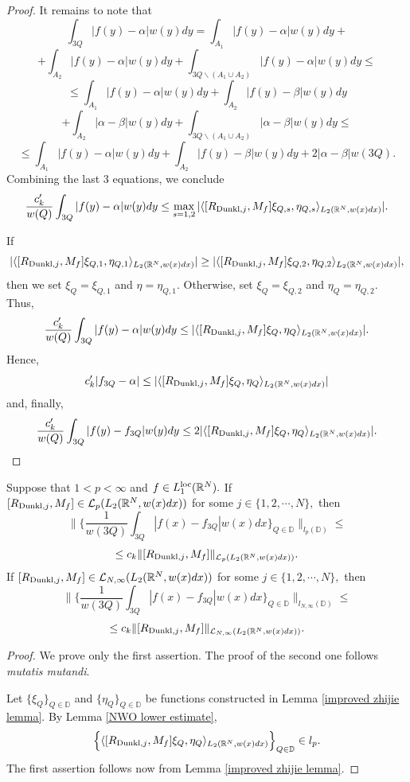 \documentclass{amsart}
\begin{document}
\begin{proof}
It remains to note that
$$\int_{3Q}|f(y)-\alpha|w(y)dy=\int_{A_1}|f(y)-\alpha|w(y)dy+$$
$$+\int_{A_2}|f(y)-\alpha|w(y)dy+\int_{3Q\backslash(A_1\cup A_2)}|f(y)-\alpha|w(y)dy\leq$$
$$\leq\int_{A_1}|f(y)-\alpha|w(y)dy+\int_{A_2}|f(y)-\beta|w(y)dy$$
$$+\int_{A_2}|\alpha-\beta|w(y)dy+\int_{3Q\backslash(A_1\cup A_2)}|\alpha-\beta|w(y)dy\leq$$
$$\leq\int_{A_1}|f(y)-\alpha|w(y)dy+\int_{A_2}|f(y)-\beta|w(y)dy+2|\alpha-\beta|w(3Q).$$
Combining the last $3$ equations, we conclude
$$\frac{c_k'}{w(Q)}\int_{3Q}|f(y)-\alpha|w(y)dy\leq\max_{s=1,2}|\langle[R_{{\rm Dunkl},j},M_f]\xi_{Q,s},\eta_{Q,s}\rangle_{L_2(\mathbb{R}^N,w(x)dx)}|.$$

If
$$|\langle[R_{{\rm Dunkl},j},M_f]\xi_{Q,1},\eta_{Q,1}\rangle_{L_2(\mathbb{R}^N,w(x)dx)}|\geq |\langle[R_{{\rm Dunkl},j},M_f]\xi_{Q,2},\eta_{Q,2}\rangle_{L_2(\mathbb{R}^N,w(x)dx)}|,$$
then we set $\xi_Q=\xi_{Q,1}$ and $\eta=\eta_{Q,1}.$ Otherwise, set $\xi_Q=\xi_{Q,2}$ and $\eta_Q=\eta_{Q,2}.$ Thus,
$$\frac{c_k'}{w(Q)}\int_{3Q}|f(y)-\alpha|w(y)dy\leq|\langle[R_{{\rm Dunkl},j},M_f]\xi_Q,\eta_Q\rangle_{L_2(\mathbb{R}^N,w(x)dx)}|.$$
Hence,
$$c_k'|f_{3Q}-\alpha|\leq|\langle[R_{{\rm Dunkl},j},M_f]\xi_Q,\eta_Q\rangle_{L_2(\mathbb{R}^N,w(x)dx)}|$$
and, finally,
$$\frac{c_k'}{w(Q)}\int_{3Q}|f(y)-f_{3Q}|w(y)dy\leq 2|\langle[R_{{\rm Dunkl},j},M_f]\xi_Q,\eta_Q\rangle_{L_2(\mathbb{R}^N,w(x)dx)}|.$$
\end{proof}

\begin{lemma}\label{standard} Suppose that $1<p<\infty$ and $f\in L_1^{{\rm loc}}(\mathbb{R}^N).$ If $[R_{{\rm Dunkl},j},M_f]\in\mathcal{L}_p(L_2(\mathbb{R}^N,w(x)dx))$ for some $j\in\{1,2,\cdots,N\},$ then
$$\Big\|\Big\{\frac1{w(3Q)}\int_{3Q}|f(x)-f_{3Q}|w(x)dx\Big\}_{Q\in\mathbb{D}}\Big\|_{l_p(\mathbb{D})}\leq$$
$$\leq c_k\|[R_{{\rm Dunkl},j},M_f]\|_{\mathcal{L}_p(L_2(\mathbb{R}^N,w(x)dx))}.$$
If $[R_{{\rm Dunkl},j},M_f]\in\mathcal{L}_{N,\infty}(L_2(\mathbb{R}^N,w(x)dx))$ for some $j\in\{1,2,\cdots,N\},$ then
$$\Big\|\Big\{\frac1{w(3Q)}\int_{3Q}|f(x)-f_{3Q}|w(x)dx\Big\}_{Q\in\mathbb{D}}\Big\|_{l_{N,\infty}(\mathbb{D})}\leq$$
$$\leq c_k\|[R_{{\rm Dunkl},j},M_f]\|_{\mathcal{L}_{N,\infty}(L_2(\mathbb{R}^N,w(x)dx))}.$$
\end{lemma}
\begin{proof} We prove only the first assertion. The proof of the second one follows {\it mutatis mutandi}.

Let $\{\xi_Q\}_{Q\in\mathbb{D}}$ and $\{\eta_Q\}_{Q\in\mathbb{D}}$ be functions constructed in Lemma \ref{improved zhijie lemma}. By Lemma \ref{NWO lower estimate},
$$\Big\{\langle [R_{{\rm Dunkl},j},M_f]\xi_Q,\eta_Q\rangle_{L_2(\mathbb{R}^N,w(x)dx)}\Big\}_{Q\in\mathbb{D}}\in l_p.$$
The first assertion follows now from Lemma \ref{improved zhijie lemma}.
\end{proof}
\end{document}
